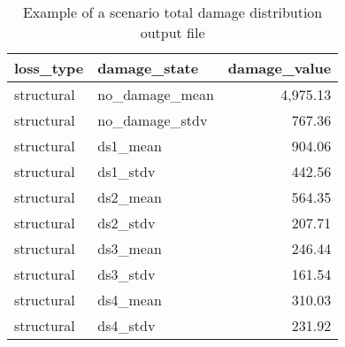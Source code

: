 \begin{table}[htbp]
\centering
\begin{tabular}{llr}
\hline
\rowcolor{lightgray}
\textbf{loss\_type} & \textbf{damage\_state} & \textbf{damage\_value} \\ \hline
structural & no\_damage\_mean & 4,975.13 \\
structural & no\_damage\_stdv & 767.36 \\
structural & ds1\_mean & 904.06 \\
structural & ds1\_stdv & 442.56 \\
structural & ds2\_mean & 564.35 \\
structural & ds2\_stdv & 207.71 \\
structural & ds3\_mean & 246.44 \\
structural & ds3\_stdv & 161.54 \\
structural & ds4\_mean & 310.03 \\
structural & ds4\_stdv & 231.92 \\
\hline
\end{tabular}
\caption{Example of a scenario total damage distribution output file}
\label{output:scenario_damage_total}
\end{table}

